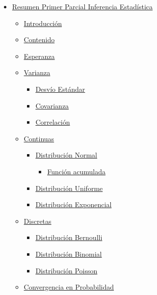 \documentclass[
]{article}
\providecommand{\tightlist}{%
  \setlength{\itemsep}{0pt}\setlength{\parskip}{0pt}}
\begin{document}
\begin{itemize}
\tightlist
\item
  \protect\hyperlink{resumen-primer-parcial-inferencia-estaduxedstica}{Resumen
  Primer Parcial Inferencia Estadística}

  \begin{itemize}
  \tightlist
  \item
    \protect\hyperlink{introducciuxf3n}{Introducción}
  \item
    \protect\hyperlink{contenido}{Contenido}
  \item
    \protect\hyperlink{esperanza}{Esperanza}
  \item
    \protect\hyperlink{varianza}{Varianza}

    \begin{itemize}
    \tightlist
    \item
      \protect\hyperlink{desvuxedo-estuxe1ndar}{Desvío Estándar}
    \item
      \protect\hyperlink{covarianza}{Covarianza}
    \item
      \protect\hyperlink{correlaciuxf3n}{Correlación}
    \end{itemize}
  \item
    \protect\hyperlink{continuas}{Continuas}

    \begin{itemize}
    \tightlist
    \item
      \protect\hyperlink{distribuciuxf3n-normal}{Distribución Normal}

      \begin{itemize}
      \tightlist
      \item
        \protect\hyperlink{funciuxf3n-acumulada}{Función acumulada}
      \end{itemize}
    \item
      \protect\hyperlink{distribuciuxf3n-uniforme}{Distribución
      Uniforme}
    \item
      \protect\hyperlink{distribuciuxf3n-exponencial}{Distribución
      Exponencial}
    \end{itemize}
  \item
    \protect\hyperlink{discretas}{Discretas}

    \begin{itemize}
    \tightlist
    \item
      \protect\hyperlink{distribuciuxf3n-bernoulli}{Distribución
      Bernoulli}
    \item
      \protect\hyperlink{distribuciuxf3n-binomial}{Distribución
      Binomial}
    \item
      \protect\hyperlink{distribuciuxf3n-poisson}{Distribución Poisson}
    \end{itemize}
  \item
    \protect\hyperlink{convergencia-en-probabilidad}{Convergencia en
    Probabilidad}


\end{itemize}
\end{itemize}
\end{document}
